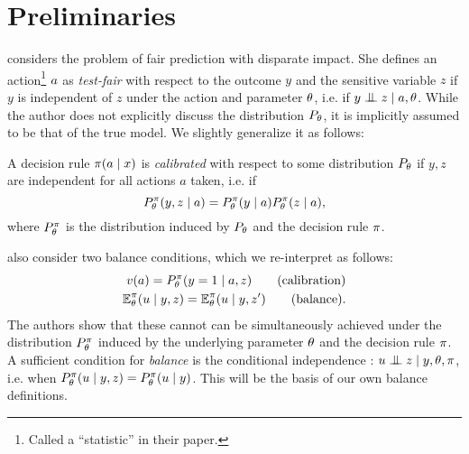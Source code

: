 \section{Preliminaries}

\label{sec:preliminaries}
\citep{chouldechova2016fair} considers the problem of fair prediction
with disparate impact. She defines an action\footnote{Called a
  ``statistic'' in their paper.} $a$ as \emph{test-fair} with respect
to the outcome $y$ and the sensitive variable $z$ if $y$ is
independent of $z$ under the action and parameter $\theta$, i.e. if
$y \indep z \mid \act, \param$.  While the author does not explicitly
discuss the distribution $P_\theta$, it is implicitly assumed to be that of the true model. We slightly generalize it as follows:
\begin{definition}
  A decision rule $\pi(a \mid x)$ is \emph{calibrated} with respect to some distribution $P_\theta$ if $y, z$ are independent for all actions $a$ taken, i.e. if
  \begin{equation}
    \label{eq:calibrated-rule}
    P^\pi_\theta(y, z \mid a) =  P^\pi_\theta(y \mid a) P^\pi_\theta(z \mid a),
  \end{equation}
  where $P_\theta^\pi$ is the distribution induced by $P_\theta$ and the decision rule $\pi$.
  \label{def:calibrated-rule}
\end{definition}
\iffalse
Note in particular that in the above definition there is only an indirect dependency on the decision rule itself. 
\cd{Not sure if the following is useful}
\begin{align*}
&\sum_\obs \pol(\act | \obs) P_\param(\obs | \out, \sns) P_\param(\out | \sns)
\\
\times
&\sum_\obs \pol(\act | \obs) P_\param(\obs)
\\
=&
\sum_\obs \pol(\act | \obs) P_\param(\obs | \out) P_\param(\out)
\\
\times&
\sum_\obs \pol(\act | \obs) P_\param(\obs | \sns).
\end{align*}
\fi


\citep{kleinberg2016inherent} also consider two balance conditions, which we re-interpret as follows:
\ifdefined \longver
\begin{align}
  v(a) = P_\theta^\pi(y = 1 \mid a, z)  \tag{calibration}\\
  \mathop{\mbox{\ensuremath{\mathbb{E}}}}\nolimits_\theta^\pi(u \mid y, z) = \mathop{\mbox{\ensuremath{\mathbb{E}}}}\nolimits_\theta^\pi(u \mid y, z') \tag{balance}.
\end{align}
The authors show that these cannot can be simultaneously achieved
under the distribution $P_\theta^\pi$ induced by the underlying
parameter $\theta$ and the decision rule $\pi$.
A sufficient condition for
\emph{balance} is the conditional independence :
$\util \indep z \mid y, \param, \pol$, i.e. when
$P_\theta^\pi(u \mid y , z) = P_\theta^\pi(u \mid y)$. This
will be the basis of our own balance definitions. 

